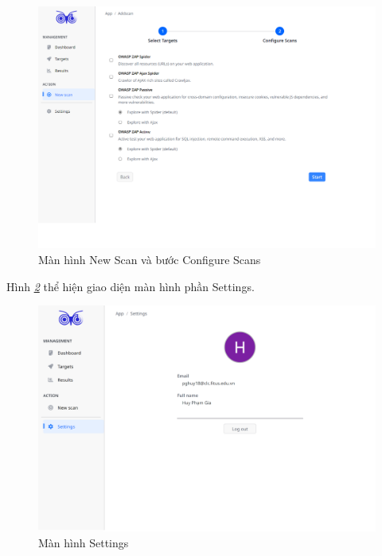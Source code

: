 \begin{figure}[H]
      \centering
      \includegraphics[width=\textwidth]{applied-thesis-chapters/chapter-6/Màn hình New Scan và bước Configure Scans.png}
      \caption{Màn hình New Scan và bước Configure Scans}
      \label{fig:ManHinhNewScanVaConfigureScans}
\end{figure}

\tab \tab Hình \textit{\ref{fig:ManHinhSettings} } thể hiện giao diện màn hình phần Settings.

\begin{figure}[H]
      \centering
      \includegraphics[width=\textwidth]{applied-thesis-chapters/chapter-6/Màn hình Settings.png}
      \caption{Màn hình Settings}
      \label{fig:ManHinhSettings}
\end{figure}

